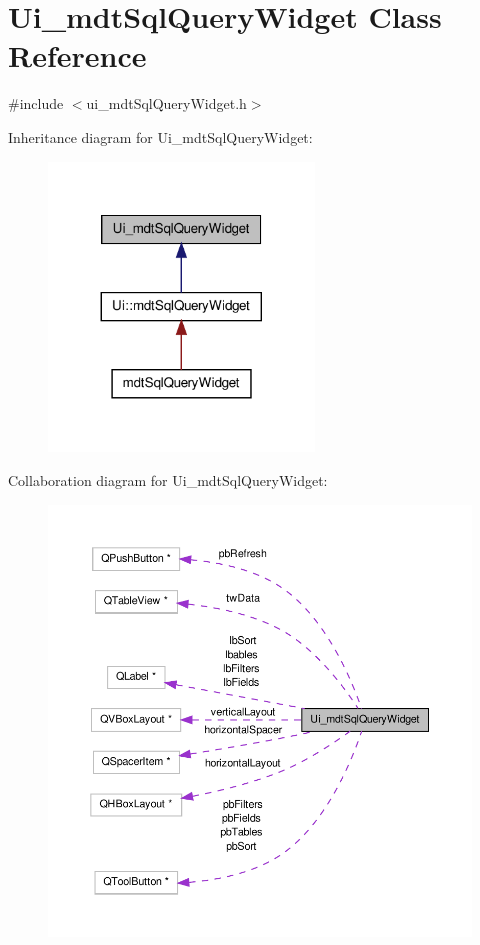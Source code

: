 \hypertarget{class_ui__mdt_sql_query_widget}{\section{Ui\-\_\-mdt\-Sql\-Query\-Widget Class Reference}
\label{class_ui__mdt_sql_query_widget}
}


{\ttfamily \#include $<$ui\-\_\-mdt\-Sql\-Query\-Widget.\-h$>$}



Inheritance diagram for Ui\-\_\-mdt\-Sql\-Query\-Widget\-:\nopagebreak
\begin{figure}[H]
\begin{center}
\leavevmode
\includegraphics[width=200pt]{class_ui__mdt_sql_query_widget__inherit__graph}
\end{center}
\end{figure}


Collaboration diagram for Ui\-\_\-mdt\-Sql\-Query\-Widget\-:\nopagebreak
\begin{figure}[H]
\begin{center}
\leavevmode
\includegraphics[width=350pt]{class_ui__mdt_sql_query_widget__coll__graph}
\end{center}
\end{figure}
